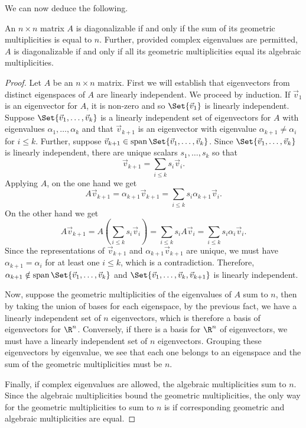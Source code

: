 We can now deduce the following.
\begin{theorem}
	An $n\times n$ matrix $A$ is diagonalizable if and only if the sum of its geometric multiplicities
	is equal to $n$. Further, provided complex eigenvalues are permitted, $A$ is diagonalizable if and
	only if all its geometric multiplicities equal its algebraic multiplicities.
\end{theorem}
\begin{proof}
	Let $A$ be an $n\times n$ matrix.
	First we will establish that eigenvectors from distinct eigenspaces of $A$ are linearly independent. We proceed by
	induction. If $\vec v_1$ is an eigenvector for $A$, it is non-zero and so $\Set{\vec v_1}$ is linearly independent.
	Suppose $\Set{\vec v_1,\ldots,\vec v_k}$ is a linearly independent set of eigenvectors for $A$ with eigenvalues
	$\alpha_1,\ldots,\alpha_k$ and that $\vec v_{k+1}$ is an eigenvector with eigenvalue $\alpha_{k+1}\neq \alpha_i$
	for $i\leq k$. Further, suppose $\vec v_{k+1}\in\Span\Set{\vec v_1,\ldots,\vec v_k}$. Since $\Set{\vec v_1,\ldots,\vec v_k}$
	is linearly independent, there are unique scalars $s_1,\ldots,s_k$ so that
	\[
		\vec v_{k+1}=\sum_{i\leq k}s_i\vec v_i.
	\]
	Applying $A$, on the one hand we get
	\[
		A\vec v_{k+1}=\alpha_{k+1}\vec v_{k+1} = 
		\sum_{i\leq k}s_i\alpha_{k+1}\vec v_i.
	\]
	On the other hand we get
	\[
		A\vec v_{k+1}=
		A\left(\sum_{i\leq k}s_i\vec v_i\right)=
		\sum_{i\leq k}s_iA\vec v_i=
		\sum_{i\leq k}s_i\alpha_i\vec v_i.
	\]
	Since the representations of $\vec v_{k+1}$ and $\alpha_{k+1}\vec v_{k+1}$ are unique, 
	we must have $\alpha_{k+1}=\alpha_i$ for at least one $i\leq k$, which is a contradiction. Therefore,
	$\alpha_{k+1}\notin\Span\Set{\vec v_1,\ldots,\vec v_k}$ and $\Set{\vec v_1,\ldots,\vec v_k, \vec v_{k+1}}$
	is linearly independent.


	Now, suppose the geometric multiplicities of the eigenvalues of $A$ sum to $n$, then by
	taking the union of bases for each eigenspace, by the previous fact, we have a linearly independent
	set of $n$ eigenvectors, which is therefore a basis of eigenvectors for $\R^n$. Conversely, if there is
	a basis for $\R^n$ of eigenvectors, we must have a linearly independent set of $n$ eigenvectors. Grouping
	these eigenvectors by eigenvalue, we see that each one belongs to an eigenspace and the sum of the geometric
	multiplicities must be $n$.

	Finally, if complex eigenvalues are allowed, the algebraic multiplicities sum to $n$. Since the algebraic multiplicities
	bound the geometric multiplicities, the only way for the geometric multiplicities to sum to $n$ is if
	corresponding geometric and algebraic multiplicities are equal.


\end{proof}
